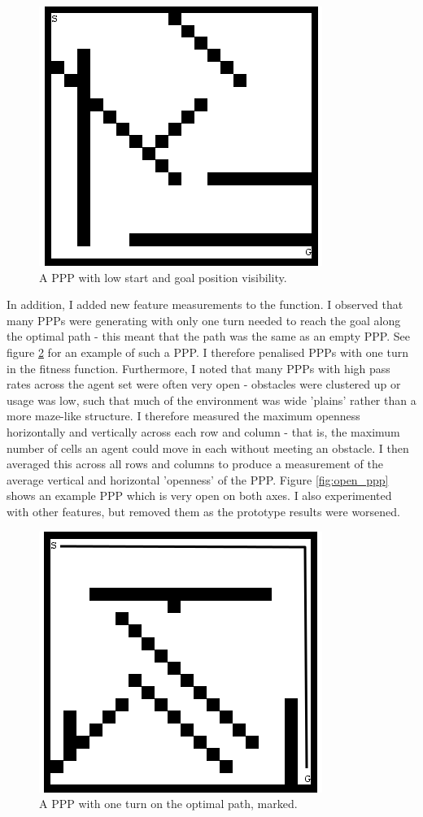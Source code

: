 \documentclass[authoryearcitations]{UoYCSproject}
\begin{document}
\begin{figure}
\graphicspath{ {DesignImpPics/} }
\includegraphics[scale=0.65]{goalStartVis.png}
\caption{A PPP with low start and goal position visibility.}
\label{fig:weighted_sum_ppp}
\end{figure}

In addition, I added new feature measurements to the function. I observed that many PPPs were generating with only one turn needed to reach the goal along the optimal path - this meant that the path was the same as an empty PPP. See figure \ref{fig:one_turn_ppp} for an example of such a PPP. I therefore penalised PPPs with one turn in the fitness function. Furthermore, I noted that many PPPs with high pass rates across the agent set were often very open - obstacles were clustered up or usage was low, such that much of the environment was wide 'plains' rather than a more maze-like structure. I therefore measured the maximum openness horizontally and vertically across each row and column - that is, the maximum number of cells an agent could move in each without meeting an obstacle. I then averaged this across all rows and columns to produce a measurement of the average vertical and horizontal 'openness' of the PPP. Figure \ref{fig:open_ppp} shows an example PPP which is very open on both axes. I also experimented with other features, but removed them as the prototype results were worsened.

\begin{figure}
\graphicspath{ {DesignImpPics/} }
\includegraphics[scale=0.65]{oneTurn.png}
\caption{ A PPP with one turn on the optimal path, marked.}
\label{fig:one_turn_ppp}
\end{figure}
\end{document}
